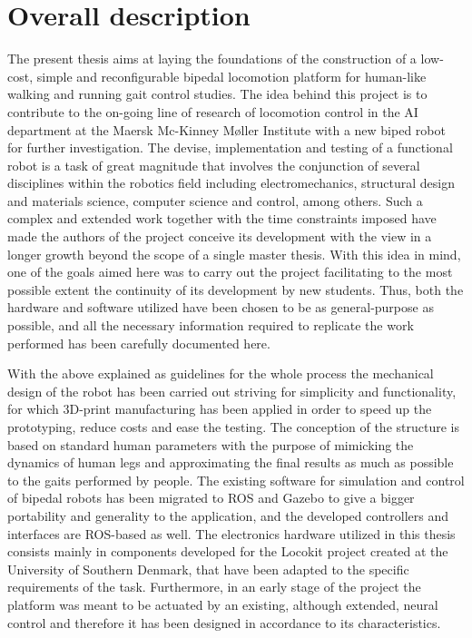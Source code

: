 
\section{Overall description}
\label{sec:overall_description}
The present thesis aims at laying the foundations of the construction of a low-cost, simple and reconfigurable bipedal locomotion platform for human-like walking and running gait control studies. 
The idea behind this project is to contribute to the on-going line of research of locomotion control in the AI department at the Maersk Mc-Kinney Møller Institute with a new biped robot for further investigation.
The devise, implementation and testing of a functional robot is a task of great magnitude that involves the conjunction of several disciplines within the robotics field including electromechanics, structural design and materials science, computer science and control, among others.
Such a complex and extended work together with the time constraints imposed have made the authors of the project conceive its development with the view in a longer growth beyond the scope of a single master thesis.
With this idea in mind, one of the goals aimed here was to carry out the project facilitating to the most possible extent the continuity of its development by new students. 
Thus, both the hardware and software utilized have been chosen to be as general-purpose as possible, and all the necessary information required to replicate the work performed has been carefully documented here.

With the above explained as guidelines for the whole process the mechanical design of the robot has been carried out striving for simplicity and functionality, for which 3D-print manufacturing has been applied in order to speed up the prototyping, reduce costs and ease the testing.
The conception of the structure is based on standard human parameters with the purpose of mimicking the dynamics of human legs and approximating the final results as much as possible to the gaits performed by people.
The existing software for simulation and control of bipedal robots has been migrated to ROS \cite{ros} and Gazebo \cite{gazebo} to give a bigger portability and generality to the application, and the developed controllers and interfaces are ROS-based as well. 
The electronics hardware utilized in this thesis consists mainly in components developed for the Locokit project \cite{locokit} created at the University of Southern Denmark, that have been adapted to the specific requirements of the task.
Furthermore, in an early stage of the project the platform was meant to be actuated by an existing, although extended, neural control and therefore it has been designed in accordance to its characteristics.